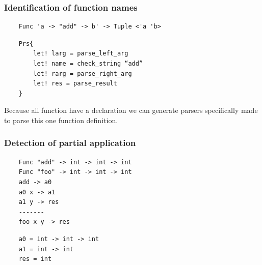 \begin{frame}[fragile]
    \frametitle{Identification of function names}
    
    \begin{lstlisting}
    Func 'a -> "add" -> b' -> Tuple <'a 'b>
    \end{lstlisting}

    \begin{lstlisting}
    Prs{
        let! larg = parse_left_arg
        let! name = check_string “add”
        let! rarg = parse_right_arg
        let! res = parse_result
    }
    \end{lstlisting}

    Because all function have a declaration we can generate parsers specifically made to parse this one function definition. 

\end{frame}

\begin{frame}[fragile]
    \frametitle{Detection of partial application}   
    
    \begin{lstlisting}
    Func "add" -> int -> int -> int
    Func "foo" -> int -> int -> int
    add -> a0
    a0 x -> a1
    a1 y -> res
    -------
    foo x y -> res
    \end{lstlisting}
    \begin{lstlisting}
    a0 = int -> int -> int
    a1 = int -> int
    res = int
    \end{lstlisting}


\end{frame}